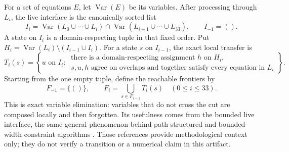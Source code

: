 \documentclass[11pt,twoside]{article}
\theoremstyle{remark}
\begin{document}
For a set of equations $E$, let $\operatorname{Var}(E)$ be its variables.
After processing through $L_i$, the live interface is the canonically sorted
list
\begin{equation}
  I_i = \operatorname{Var}(L_0\cup\cdots\cup L_i)
  \cap \operatorname{Var}(L_{i+1}\cup\cdots\cup L_{33}),
  \qquad I_{-1}=().
  \label{eq:live-interface}
\end{equation}
A state on $I_i$ is a domain-respecting tuple in that fixed order.  Put
$H_i=\operatorname{Var}(L_i)\setminus(I_{i-1}\cup I_i)$.  For a state $s$
on $I_{i-1}$, the exact local transfer is
\begin{equation}
  T_i(s)=\left\{u\text{ on }I_i:\
    \begin{array}{l}
      \text{there is a domain-respecting assignment }h\text{ on }H_i,\\[-2pt]
      s,u,h\text{ agree on overlaps and together satisfy every equation in }L_i
    \end{array}
  \right\}.
  \label{eq:local-transfer}
\end{equation}
Starting from the one empty tuple, define the reachable frontiers by
\begin{equation}
  F_{-1}=\{()\},
  \qquad
  F_i=\bigcup_{s\in F_{i-1}}T_i(s)
  \quad(0\leq i\leq 33).
  \label{eq:frontier-recurrence}
\end{equation}
This is exact variable elimination: variables that do not cross the cut are
composed locally and then forgotten.  Its usefulness comes from the bounded
live interface, the same general phenomenon behind path-structured and
bounded-width constraint algorithms \cite{Freuder1990,DechterPearl1989}.
Those references provide methodological context only; they do not verify a
transition or a numerical claim in this artifact.
\end{document}
